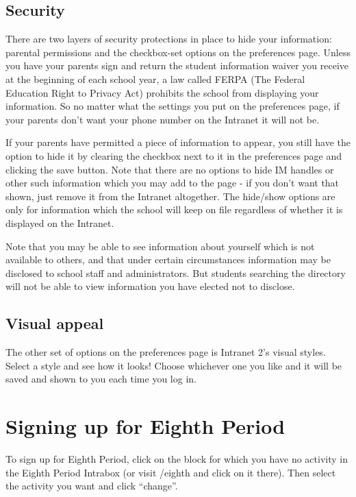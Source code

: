 \documentclass[11pt,letterpaper]{report}
\begin{document}
\subsection{Security}
There are two layers of security protections in place to hide your information:
parental permissions and the checkbox-set options on the preferences page.
Unless you have your parents sign and return the student information waiver you
receive at the beginning of each school year, a law called FERPA (The Federal
Education Right to Privacy Act) prohibits the school from displaying your
information.  So no matter what the settings you put on the preferences page,
if your parents don't want your phone number on the Intranet it will not be.

If your parents have permitted a piece of information to appear, you still
have the option to hide it by clearing the checkbox next to it in the preferences
page and clicking the save button.  Note that there are no options to hide IM
handles or other such information which you may add to the page - if you don't
want that shown, just remove it from the Intranet altogether.  The hide/show
options are only for information which the school will keep on file regardless
of whether it is displayed on the Intranet.

Note that you may be able to see information about yourself which is not
available to others, and that under certain circumstances information may
be disclosed to school staff and administrators.  But students searching
the directory will not be able to view information you have elected not to
disclose.
\subsection{Visual appeal}
The other set of options on the preferences page is Intranet 2's visual styles.
Select a style and see how it looks!  Choose whichever one you like and it will
be saved and shown to you each time you log in.
\section{Signing up for Eighth Period}
To sign up for Eighth Period, click on the block for which you have no activity 
in the Eighth Period Intrabox (or visit /eighth and click on it there).  Then
select the activity you want and click ``change''.
\end{document}
